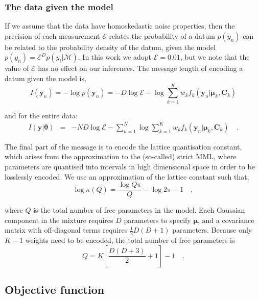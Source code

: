 \documentclass{elsarticle}
\newcommand{\vect}[1]{\boldsymbol{\mathbf{#1}}}
\def\cov{C}
\def\veccov{\vect{\cov}}
\def\vecmean{\vect{\mu}}
\def\vectheta{\vect{\theta}}
\def\weight{w}
\def\datum{y}
\def\data{\vect{\datum}}
\begin{document}
\subsubsection{The data given the model}
If we assume that the data have homoskedastic noise properties, then the 
precision of each measurement $\mathcal{E}$ relates the probability of a
datum $p(\datum_n)$ can be related to the probability density of
the datum, given the model 
$p(\datum_n) = \mathcal{E}^{D}p(y_i|\mathcal{M})$.
In this work we adopt $\mathcal{E} = 0.01$, but we note that the value of
$\mathcal{E}$ has no effect on our inferences.  The message length of encoding
a datum given the model is,
\begin{equation}
  I(\data_n) = -\log{p(\data_n)} = -D\log\mathcal{E} - \log\sum_{k=1}^{K}\weight_{k}f_{k}(\data_n|\vecmean_k,\veccov_k)
\end{equation}

\noindent{}and for the entire data:
\begin{eqnarray}
  I(\data|\vectheta) &=& -ND\log\mathcal{E} - \sum_{n=1}^{N}\log\sum_{k=1}^{K}w_{k}f_k(\data_n|\vecmean_k,\veccov_k) \quad .
\end{eqnarray}

The final part of the message is to encode the lattice quantisation constant,
which arises from the approximation to the (so-called) strict MML, where
parameters are quantised into intervals in high dimensional space in order to
be losslessly encoded.  We use an approximation of the lattice constant
\citep[see Sections 5.1.12 and 3.3.4 of ]
{Wallace_2005} such that,
\begin{equation}
  \log\kappa(Q) = \frac{\log{Q\pi}}{Q} - \log{2\pi} - 1 \quad ,
\end{equation}

\noindent{}where $Q$ is the total number of free parameters in the model. Each
Gaussian component in the mixture requires $D$ parameters to specify $\vecmean$,
and a covariance matrix with off-diagonal terms requires $\frac{1}{2}D(D+1)$ 
parameters. Because only $K - 1$ weights need to be encoded, the total number of free
parameters is
\begin{equation}
    Q = K\left[\frac{D(D+3)}{2} + 1\right] - 1 \quad .
    \label{eq:number-of-parameters}
\end{equation}


\subsection{Objective function}
\end{document}
